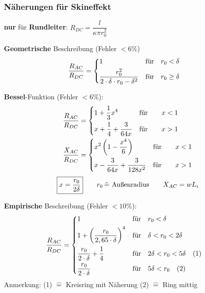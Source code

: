 \subsubsection{Näherungen für Skineffekt}
\textbf{nur} für \textbf{Rundleiter}: $ R_{DC} = \dfrac{l}{\kappa \pi r_0^2}$
\begin{description}
	\item \textbf{Geometrische} Beschreibung (Fehler $ < 6\% $)
	  	\begin{align*}
		\frac{R_{AC}}{R_{DC}} & =
		\begin{dcases}
			1 & \text{für} \quad r_0 < \delta \\
			\frac{r_0^2}{2\cdot \delta \cdot r_0 - \delta^2} & \text{für} \quad r_0 \geq \delta
		\end{dcases}
	\end{align*}
	
    \item \textbf{Bessel}-Funktion (Fehler $ < 6 \% $):
          \begin{align*}
              \frac{R_{AC}}{R_{DC}} & =
              \begin{dcases}
                  1 + \frac{1}{3}x^4              & \text{für} \qquad x < 1 \\
                  x + \frac{1}{4} + \frac{3}{64x} & \text{für} \qquad x > 1 \\
              \end{dcases} \\
              \frac{X_{AC}}{R_{DC}} & =
              \begin{dcases}
                  x^2\left( 1-\frac{x^4}{6} \right)   & \text{für} \qquad x < 1 \\
                  x- \frac{3}{64x} + \frac{3}{128x^2} & \text{für} \qquad x > 1 \\
              \end{dcases}
          \end{align*}
          \[
              \boxed{x=\frac{r_0}{2\delta}} \qquad r_0 \, \hat{=} \textnormal{ Außenradius} \qquad X_{AC} = wL_i
          \]
          
  	\item \textbf{Empirische} Beschreibung (Fehler $ < 10\% $):
  	\begin{align*}
  	\frac{R_{AC}}{R_{DC}} & =
  		\begin{dcases}
  			1               & \text{für} \quad r_0 < \delta \\
  			1+ \left( \frac{r_0}{2,65\cdot \delta} \right)^4  & \text{für} \quad \delta < r_0 < 2\delta \\
  			\frac{r_0}{2 \cdot\delta} + \frac{1}{4} & \text{für} \quad 2\delta < r_0 < 5\delta \quad (1) \\
  			\frac{r_0}{2\cdot \delta} & \text{für} \quad 5\delta < r_0 \quad (2)
  		\end{dcases}
  	\end{align*}
 \footnotesize Anmerkung: (1) $\widehat{=}$ Kreisring mit Näherung \quad (2) $\widehat{=}$ Ring mittig
\end{description}


